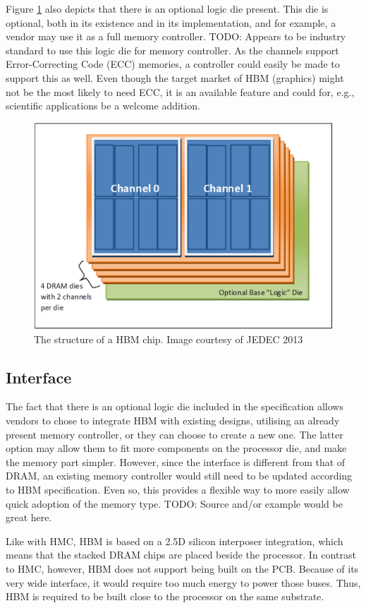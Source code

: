 Figure \ref{HBM-structure} also depicts that there is an optional logic die present. This die is optional, both in its existence and in its implementation, and for example, a vendor may use it as a full memory controller. TODO: Appears to be industry standard to use this logic die for memory controller. As the channels support Error-Correcting Code (ECC) memories, a controller could easily be made to support this as well. Even though the target market of HBM (graphics) might not be the most likely to need ECC, it is an available feature and could for, e.g., scientific applications be a welcome addition. 

\begin{figure}[!h]
\centering
\includegraphics[width=0.75\linewidth]{figure/HBM_structure.PNG}
\caption{The structure of a HBM chip. Image courtesy of JEDEC 2013 }
\label{HBM-structure}
\end{figure}

\subsection{Interface}
The fact that there is an optional logic die included in the specification allows vendors to chose to integrate HBM with existing designs, utilising an already present memory controller, or they can choose to create a new one. The latter option may allow them to fit more components on the processor die, and make the memory part simpler. However, since the interface is different from that of DRAM, an existing memory controller would still need to be updated according to HBM specification. Even so, this provides a flexible way to more easily allow quick adoption of the memory type. TODO: Source and/or example would be great here.
\bigskip

Like with HMC, HBM is based on a 2.5D silicon interposer integration, which means that the stacked DRAM chips are placed beside the processor. In contrast to HMC, however, HBM does not support being built on the PCB. Because of its very wide interface, it would require too much energy to power those buses. Thus, HBM is required to be built close to the processor on the same substrate.

